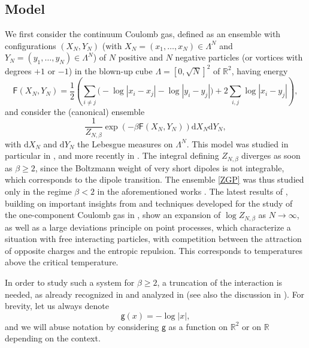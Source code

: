 \documentclass[a4paper,10pt,leqno]{amsart}
\numberwithin{equation}{section}
\newcommand{\R}{\mathbb{R}}
\newcommand{\dd}{\mathrm{d}}
\def\hal{\frac{1}{2}}
\def\XN{X_N}
\def\YN{Y_N}
\def\ZNbeta{Z_{N,\beta}}
\def\g{\mathsf{g}}
\def\F{\mathsf{F}}
\begin{document}
\subsection{Model}
We first consider the continuum Coulomb gas, defined as an ensemble with configurations $(\XN, \YN)$ (with $X_N=(x_1, \dots, x_N) \in \Lambda^N $ and $Y_N=(y_1, \dots, y_N)\in \Lambda^N$) of $N$ positive and $N$ negative particles (or vortices with degrees $+1$ or $-1$) in the blown-up cube $\Lambda = [0,\sqrt{N}]^2$ of $\R^2$, having energy
\begin{equation}\label{1.1} \F(\XN, \YN)= \hal \left( \sum_{i\neq j} \bigl(- \log |x_i-x_j|-\log |y_i-y_j|\bigr)+ 2 \sum_{i,j} \log |x_i-y_j|\right),\end{equation} and
consider the (canonical) ensemble
\begin{equation}\label{ZGP} \frac{1}{Z_{N,\beta}} \exp\left(- \beta \F(X_N, Y_N) \right) \dd X_N \dd Y_N ,\end{equation}
with $\dd X_N$ and $\dd Y_N$ the Lebesgue measures on $\Lambda^N$.
This model was studied in particular in \cite{GunPan,DeutschLavaud}, and more recently in \cite{LSZ}.
The integral defining $\ZNbeta$ diverges as soon as $\beta \ge 2$, since the Boltzmann weight of very short dipoles is not integrable, which corresponds to the dipole transition.
The ensemble \eqref{ZGP} was thus studied only in the regime $\beta <2$ in the aforementioned works \cite{GunPan,DeutschLavaud,LSZ}.
The latest results of \cite{LSZ}, building on important insights from \cite{GunPan} and techniques developed for the study of the one-component Coulomb gas in \cite{SS2d,RougSer,LS1,LS2}, show an expansion of $\log \ZNbeta$ as $N \to \infty$, as well as a large deviations principle on point processes, which characterize a situation with free interacting particles, with competition between the attraction of opposite charges and the entropic repulsion. This corresponds to temperatures above the critical temperature.

In order to study such a system for $\beta \ge 2$, a truncation of the interaction is needed, as already recognized in \cite{Kosterlitz1974,Kosterlitz1973} and analyzed in \cite{frohlichspencer} (see also the discussion in \cite{LRVboundary}).
For brevity, let us always denote
\begin{equation*}
  \g(x)=-\log |x|,
\end{equation*}
and we will abuse notation by considering $\g$ as a function on $\R^2$ or on $\R$ depending on the context.
\end{document}
